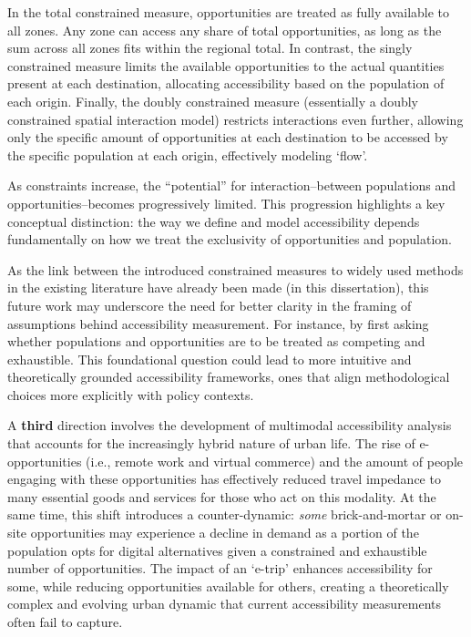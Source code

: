 \documentclass[
11pt, %
oneside, %
english, %
singlespacing, %
]{macthesis} %
\begin{document}
In the total constrained measure, opportunities are treated as fully available to all zones. Any zone can access any share of total opportunities, as long as the sum across all zones fits within the regional total. In contrast, the singly constrained measure limits the available opportunities to the actual quantities present at each destination, allocating accessibility based on the population of each origin. Finally, the doubly constrained measure (essentially a doubly constrained spatial interaction model) restricts interactions even further, allowing only the specific amount of opportunities at each destination to be accessed by the specific population at each origin, effectively modeling `flow'.

As constraints increase, the ``potential'' for interaction--between populations and opportunities--becomes progressively limited. This progression highlights a key conceptual distinction: the way we define and model accessibility depends fundamentally on how we treat the exclusivity of opportunities and population.

As the link between the introduced constrained measures to widely used methods in the existing literature have already been made (in this dissertation), this future work may underscore the need for better clarity in the framing of assumptions behind accessibility measurement. For instance, by first asking whether populations and opportunities are to be treated as competing and exhaustible. This foundational question could lead to more intuitive and theoretically grounded accessibility frameworks, ones that align methodological choices more explicitly with policy contexts.

A \textbf{third} direction involves the development of multimodal accessibility analysis that accounts for the increasingly hybrid nature of urban life. The rise of e-opportunities (i.e., remote work and virtual commerce) and the amount of people engaging with these opportunities has effectively reduced travel impedance to many essential goods and services for those who act on this modality. At the same time, this shift introduces a counter-dynamic: \emph{some} brick-and-mortar or on-site opportunities may experience a decline in demand as a portion of the population opts for digital alternatives given a constrained and exhaustible number of opportunities. The impact of an `e-trip' enhances accessibility for some, while reducing opportunities available for others, creating a theoretically complex and evolving urban dynamic that current accessibility measurements often fail to capture.
\end{document}
